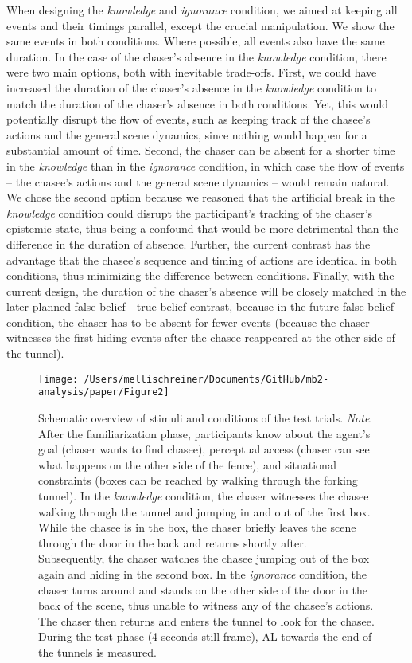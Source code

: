 \documentclass[
  man,floatsintext]{apa6}
\begin{document}
When designing the \emph{knowledge} and \emph{ignorance} condition, we aimed at keeping all events and their timings parallel, except the crucial manipulation. We show the same events in both conditions. Where possible, all events also have the same duration. In the case of the chaser's absence in the \emph{knowledge} condition, there were two main options, both with inevitable trade-offs. First, we could have increased the duration of the chaser's absence in the \emph{knowledge} condition to match the duration of the chaser's absence in both conditions. Yet, this would potentially disrupt the flow of events, such as keeping track of the chasee's actions and the general scene dynamics, since nothing would happen for a substantial amount of time. Second, the chaser can be absent for a shorter time in the \emph{knowledge} than in the \emph{ignorance} condition, in which case the flow of events -- the chasee's actions and the general scene dynamics -- would remain natural. We chose the second option because we reasoned that the artificial break in the \emph{knowledge} condition could disrupt the participant's tracking of the chaser's epistemic state, thus being a confound that would be more detrimental than the difference in the duration of absence. Further, the current contrast has the advantage that the chasee's sequence and timing of actions are identical in both conditions, thus minimizing the difference between conditions. Finally, with the current design, the duration of the chaser's absence will be closely matched in the later planned false belief - true belief contrast, because in the future false belief condition, the chaser has to be absent for fewer events (because the chaser witnesses the first hiding events after the chasee reappeared at the other side of the tunnel).

\begin{figure}

{\centering \texttt{[image: /Users/mellischreiner/Documents/GitHub/mb2-analysis/paper/Figure2]} 

}

\caption{Schematic overview of stimuli and conditions of the test trials. \newline{} \textit{Note}. After the familiarization phase, participants know about the agent’s goal (chaser wants to find chasee), perceptual access (chaser can see what happens on the other side of the fence), and situational constraints (boxes can be reached by walking through the forking tunnel). In the \textit{knowledge} condition, the chaser witnesses the chasee walking through the tunnel and jumping in and out of the first box. While the chasee is in the box, the chaser briefly leaves the scene through the door in the back and returns shortly after. Subsequently, the chaser watches the chasee jumping out of the box again and hiding in the second box. In the \textit{ignorance} condition, the chaser turns around and stands on the other side of the door in the back of the scene, thus unable to witness any of the chasee’s actions. The chaser then returns and enters the tunnel to look for the chasee. During the test phase (4 seconds still frame), AL towards the end of the tunnels is measured.}\label{fig:fig2}
\end{figure}
\end{document}
